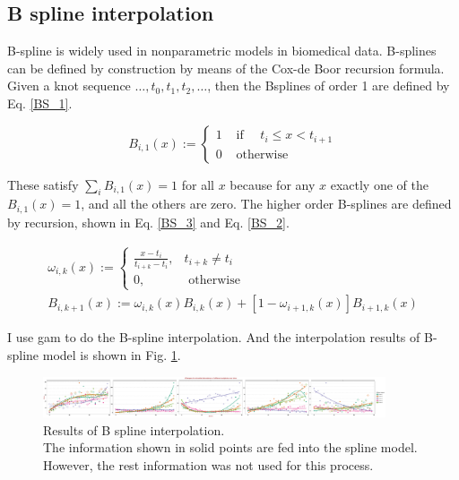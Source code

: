 \documentclass[a4 paper]{article}
\begin{document}
\subsection{B spline interpolation}

B-spline is widely used in nonparametric models in biomedical data. B-splines can be defined by construction by means of the Cox-de Boor recursion formula. Given a knot sequence $\ldots, t_{0}, t_{1}, t_{2}, \ldots$, then the Bsplines of order 1 are defined by Eq. \ref{BS_1}.

\begin{equation}
\label{BS_1}
    B_{i, 1}(x):= \begin{cases}1 & \text { if } \quad t_{i} \leq x<t_{i+1} \\ 0 & \text { otherwise }\end{cases}
    \end{equation}
    
These satisfy $\sum_{i} B_{i, 1}(x)=1$ for all $x$ because for any $x$ exactly one of the $B_{i, 1}(x)=1$, and all the others are zero.
The higher order B-splines are defined by recursion, shown in Eq. \ref{BS_3} and Eq. \ref{BS_2}.

\begin{gather}
\omega_{i, k}(x):= \begin{cases}\frac{x-t_{i}}{t_{i+k}-t_{i}}, & t_{i+k} \neq t_{i} \\ 0, & \text { otherwise }\end{cases}\label{BS_3}\\
B_{i, k+1}(x):=\omega_{i, k}(x) B_{i, k}(x)+\left[1-\omega_{i+1, k}(x)\right] B_{i+1, k}(x)\label{BS_2}
\end{gather}

I use gam\cite{gam} to do the B-spline interpolation. And the interpolation results of B-spline model is shown in Fig. \ref{bs}.

\begin{figure}[ht]
    \centering
    \includegraphics[width=0.9\textwidth]{figure/B_spline.pdf}
    \caption{Results of B spline interpolation.\\The information shown in solid points are fed into the spline model. However, the rest information was not used for this process.}
    \label{bs}
\end{figure}
\end{document}

